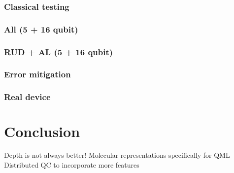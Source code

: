 \documentclass[journal=jacsat,manuscript=article]{achemso}
\begin{document}
\subsubsection{Classical testing}
\subsubsection{All (5 + 16 qubit)}
\subsubsection{RUD + AL (5 + 16 qubit)}
\subsubsection{Error mitigation}
\subsubsection{Real device}

\section{Conclusion}
Depth is not always better!
Molecular representations specifically for QML
Distributed QC to incorporate more features


\end{document}
